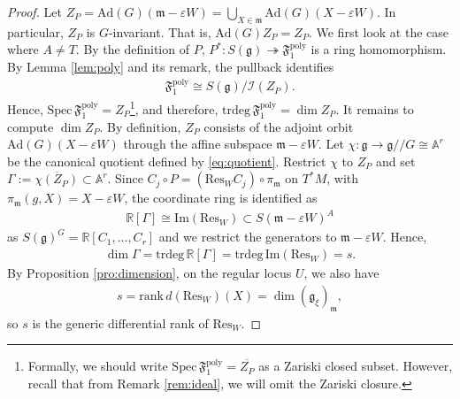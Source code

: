 \documentclass[11pt]{amsart}
\theoremstyle{definition}
\theoremstyle{plain}
\theoremstyle{conclusion}
\begin{document}
\begin{proof}
 Let $ Z_P  = \mathrm{Ad}(G)(\mathfrak{m} -\varepsilon W) = \bigcup_{X \in \mathfrak{m}} \mathrm{Ad}(G)(X - \varepsilon W)$. In particular, $Z_P$ is $G$-invariant. That is, $\mathrm{Ad}(G)Z_P = Z_P$. We first look at the case where $ A \neq T$. By the definition of $P$, $ P^* : S(\mathfrak{g}) \twoheadrightarrow \mathfrak{F}_1^{\mathrm{poly}}$ is a ring homomorphism.  By Lemma \ref{lem:poly} and its remark, the pullback identifies \begin{align*}
      \mathfrak{F}_1^{\mathrm{poly}} \cong S(\mathfrak{g})\big/\mathcal{I}(Z_P).
  \end{align*} Hence, $\mathrm{Spec}\, \mathfrak{F}_1^{\mathrm{poly}}  = Z_P$\footnote{Formally, we should write $\mathrm{Spec} \, \mathfrak{F}_1^{\mathrm{poly}} = \overline{Z_P}$ as a Zariski closed subset. However, recall that from Remark \ref{rem:ideal}, we will omit the Zariski closure.}, and therefore, $\mathrm{trdeg} \, \mathfrak{F}_1^{\mathrm{poly}}=\dim Z_P$. It remains to compute $\dim Z_P$. By definition, $Z_P$ consists of the adjoint orbit $\mathrm{Ad}(G)(X -\varepsilon W)$ through the affine subspace $\mathfrak{m} - \varepsilon W$. Let $\chi:\mathfrak{g}\to\mathfrak{g}//G\cong \mathbb{A}^r$ be the canonical quotient defined by \eqref{eq:quotient}. Restrict $\chi$ to $Z_P$ and set $\Gamma:=\overline{\chi(Z_P)}\subset\mathbb{A}^r$.  Since $C_j\circ P=(\mathrm{Res}_W C_j)\circ\pi_{\mathfrak{m}}$ on $T^*M$, with  $\pi_{\mathfrak{m}}(g,X)=X-\varepsilon W$, the coordinate ring is identified as \begin{align*}
    \mathbb{R}[\Gamma]\cong \mathrm{Im}(\mathrm{Res}_W)\subset S(\mathfrak{m}-\varepsilon W)^A
\end{align*}  as $S(\mathfrak{g})^G=\mathbb{R}[C_1,\dots,C_r]$ and we restrict the generators to $\mathfrak{m} - \varepsilon W$. Hence, \begin{align*}
    \dim\Gamma = \mathrm{trdeg}\,\mathbb{R}[\Gamma] = \mathrm{trdeg}\,\mathrm{Im}(\mathrm{Res}_W) =  s.
\end{align*} By Proposition \ref{pro:dimension}, on the regular locus $U$, we also have  \begin{align*}
   s = \mathrm{rank} \, d (\mathrm{Res}_W)(X) = \dim (\mathfrak{g}_\xi)_\mathfrak{m}  ,
\end{align*} so $s$ is the generic differential rank of $\mathrm{Res}_W$.


\end{proof}
\end{document}
